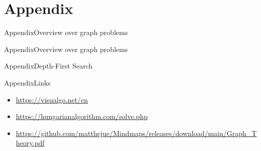 
\section{Appendix}

\begin{frame}[allowframebreaks]{Appendix}{Overview over graph problems}
\end{frame}

\begin{frame}[allowframebreaks]{Appendix}{Overview over graph problems}
\end{frame}

\begin{frame}[allowframebreaks]{Appendix}{Depth-First Search}
\end{frame}

\begin{frame}[allowframebreaks]{Appendix}{Links}
  \begin{itemize}
    \item \url{https://visualgo.net/en}
    \item \url{https://hungarianalgorithm.com/solve.php}
    \item \url{https://github.com/matthejue/Mindmaps/releases/download/main/Graph_Theory.pdf}
  \end{itemize}
\end{frame}
